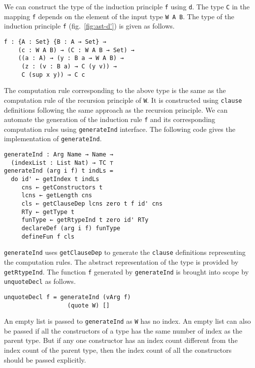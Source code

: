\documentclass[sigplan,10pt]{acmart}
\begin{document}
We can construct the type of the induction principle {\tt f} using {\tt d}. The type {\tt C} in the mapping {\tt f} depends on the element of the input type {\tt W A B}. The type of the induction principle {\tt f} (fig.~\ref{fig:ast-d'}) is given as follows.
\begin{center}
\begingroup
\begin{BVerbatim}
f : {A : Set} {B : A → Set} → 
    (c : W A B) → (C : W A B → Set) → 
    ((a : A) → (y : B a → W A B) → 
     (z : (v : B a) → C (y v)) → 
     C (sup x y)) → C c
\end{BVerbatim}
\endgroup
\end{center}
The computation rule corresponding to the above type is the same as the computation rule of the recursion principle of {\tt W}. It is constructed using {\tt clause} definitions following the same approach as the recursion principle.  We can automate the generation of the induction rule {\tt f} and its corresponding computation rules using {\tt generateInd} interface. The following code gives the implementation of {\tt generateInd}.

\begin{center}
\begingroup
\begin{BVerbatim}
generateInd : Arg Name → Name → 
  (indexList : List Nat) → TC ⊤
generateInd (arg i f) t indLs =
  do id' ← getIndex t indLs
     cns ← getConstructors t
     lcns ← getLength cns
     cls ← getClauseDep lcns zero t f id' cns
     RTy ← getType t
     funType ← getRtypeInd t zero id' RTy
     declareDef (arg i f) funType
     defineFun f cls
\end{BVerbatim}
\endgroup
\end{center}

{\tt generateInd} uses {\tt getClauseDep} to generate the {\tt clause} definitions representing the computation rules. The abstract representation of the type is provided by {\tt getRtypeInd}. The function {\tt f} generated by {\tt generateInd} is brought into scope by {\tt unquoteDecl} as follows.
\begin{center}
\begingroup
\begin{BVerbatim}
unquoteDecl f = generateInd (vArg f) 
                  (quote W) []
\end{BVerbatim}
\endgroup
\end{center}

An empty list is passed to {\tt generateInd} as {\tt W} has no index. An empty list can also be passed if all the constructors of a type has the same number of index as the parent type. But if any one constructor has an index count different from the index count of the parent type, then the index count of all the constructors should be passed explicitly.
\end{document}
